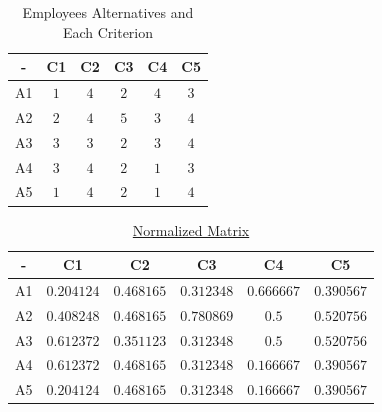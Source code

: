 \begin{table}[!ht]
    \centering
    \caption{Employees Alternatives and Each Criterion}
    \label{tab:alternatives}

    \begin{tabular}{|c|c|c|c|c|c|}
        \toprule
        -  & C1  & C2  & C3  & C4  & C5  \\

        \midrule
        A1 & $1$ & $4$ & $2$ & $4$ & $3$ \\
        A2 & $2$ & $4$ & $5$ & $3$ & $4$ \\
        A3 & $3$ & $3$ & $2$ & $3$ & $4$ \\
        A4 & $3$ & $4$ & $2$ & $1$ & $3$ \\
        A5 & $1$ & $4$ & $2$ & $1$ & $4$ \\

        \bottomrule
    \end{tabular}
\end{table}

\begin{table}[!ht]
    \centering
    \caption{
        \hyperref
        [eq:normalized_estimate]
        {Normalized Matrix}
    }
    \label{tab:normalized}

    \begin{tabular}{|c|c|c|c|c|c|}
        \toprule
        -  & C1         & C2         & C3         & C4         & C5         \\

        \midrule
        A1 & $0.204124$ & $0.468165$ & $0.312348$ & $0.666667$ & $0.390567$ \\
        A2 & $0.408248$ & $0.468165$ & $0.780869$ & $0.5$      & $0.520756$ \\
        A3 & $0.612372$ & $0.351123$ & $0.312348$ & $0.5$      & $0.520756$ \\
        A4 & $0.612372$ & $0.468165$ & $0.312348$ & $0.166667$ & $0.390567$ \\
        A5 & $0.204124$ & $0.468165$ & $0.312348$ & $0.166667$ & $0.390567$ \\

        \bottomrule
    \end{tabular}
\end{table}

